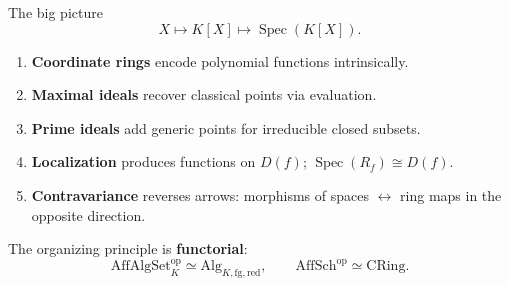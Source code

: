 \documentclass[10pt, aspectratio=169]{beamer}
\DeclareMathOperator{\Spec}{Spec}
\newcommand{\AffAlgSetK}{\mathrm{AffAlgSet}_K}
\newcommand{\AlgKfgred}{\mathrm{Alg}_{K,\mathrm{fg},\mathrm{red}}}
\newcommand{\AffSch}{\mathrm{AffSch}}
\newcommand{\CRing}{\mathrm{CRing}}
\begin{document}
\begin{frame}{The big picture}
    \[
    X \longmapsto K[X] \longmapsto \Spec(K[X]).
    \]
    \begin{enumerate}
        \item \textbf{Coordinate rings} encode polynomial functions intrinsically.
        \item \textbf{Maximal ideals} recover classical points via evaluation.
        \item \textbf{Prime ideals} add generic points for irreducible closed subsets.
        \item \textbf{Localization} produces functions on $D(f)$; $\Spec(R_f) \cong D(f)$.
        \item \textbf{Contravariance} reverses arrows: morphisms of spaces $\longleftrightarrow$ ring maps in the opposite direction.
    \end{enumerate}
    \vfill
    The organizing principle is \textbf{functorial}:
    \[
    \boxed{\AffAlgSetK^{\mathrm{op}} \simeq \AlgKfgred,
    \qquad
    \AffSch^{\mathrm{op}} \simeq \CRing.}
    \]
\end{frame}
\end{document}
